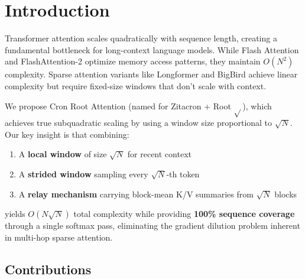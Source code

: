\documentclass{article}
\begin{document}
    \section{Introduction}

    Transformer attention scales quadratically with sequence length, creating a fundamental bottleneck for long-context language models. While Flash Attention \cite{flashattn} and FlashAttention-2 \cite{flashattn2} optimize memory access patterns, they maintain $O(N^2)$ complexity. Sparse attention variants like Longformer \cite{longformer} and BigBird \cite{bigbird} achieve linear complexity but require fixed-size windows that don't scale with context.

    We propose Cron Root Attention (named for Zitacron + Root $\sqrt{}$), which achieves true subquadratic scaling by using a window size proportional to $\sqrt{N}$. Our key insight is that combining:
    \begin{enumerate}
        \item A \textbf{local window} of size $\sqrt{N}$ for recent context
        \item A \textbf{strided window} sampling every $\sqrt{N}$-th token
        \item A \textbf{relay mechanism} carrying block-mean K/V summaries from $\sqrt{N}$ blocks
    \end{enumerate}
    yields $O(N\sqrt{N})$ total complexity while providing \textbf{100\% sequence coverage} through a single softmax pass, eliminating the gradient dilution problem inherent in multi-hop sparse attention.

    \subsection{Contributions}
\end{document}
